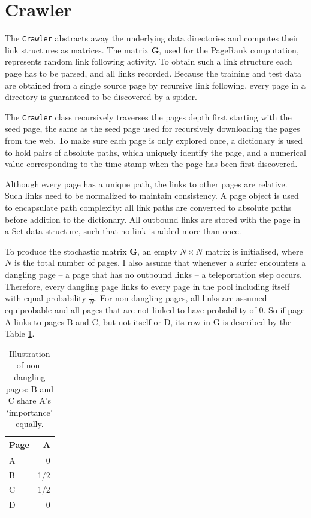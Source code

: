 \documentclass[12pt,notitlepage,twoside]{scrreprt}
\begin{document}
\section{Crawler} 

The \texttt{Crawler} abstracts away the underlying data directories and
computes their link structures as matrices.  The matrix \(\bm{G}\), used for the
PageRank computation, represents random link following activity.  To obtain
such a link structure each page has to be parsed, and all links recorded.
Because the training and test data are obtained from a single source page by recursive link
following, every page in a directory is guaranteed to be discovered by a
spider.

The \texttt{Crawler} class recursively traverses the pages depth first starting with the
seed page, the same as the seed page used for recursively downloading the pages
from the web. To make sure each page is only explored once, a dictionary is
used to hold pairs of absolute paths, which uniquely identify the page, and a
numerical value corresponding to the time stamp when the page has been first
discovered.

Although every page has a unique path, the links to other pages are relative.
Such links need to be normalized to maintain consistency.  A page object is
used to encapsulate path complexity: all link paths are converted to absolute
paths before addition to the dictionary.  All outbound links are stored with
the page in a Set data structure, such that no link is added more than once. 

To produce the stochastic matrix \(\bm{G}\), an empty \(N\times N\) matrix is initialised, where \(N\)
is the total number of pages. I also assume that whenever a surfer encounters a
dangling page -- a page that has no outbound links -- a teleportation step
occurs. Therefore, every dangling page links to every page in the pool
including itself with equal probability \(\frac{1}{N}\). For non-dangling pages, all links
are assumed equiprobable and all pages that are not linked to have probability
of 0. So if page A links to pages B and C, but not itself or D, its row in G is
described by the Table \ref{tab}.

\begin{table}
    \begin{center}
      \begin{tabular}{|l|r|}
        \hline
        Page & A \\ \hline
         A &  0  \\ \hline
         B & 1/2 \\ \hline
         C & 1/2 \\ \hline
         D & 0   \\ \hline
      \end{tabular}
      \caption{Illustration of non-dangling pages: B and C share A's `importance' equally.\label{tab}}
  \end{center}
\end{table}
\end{document}
